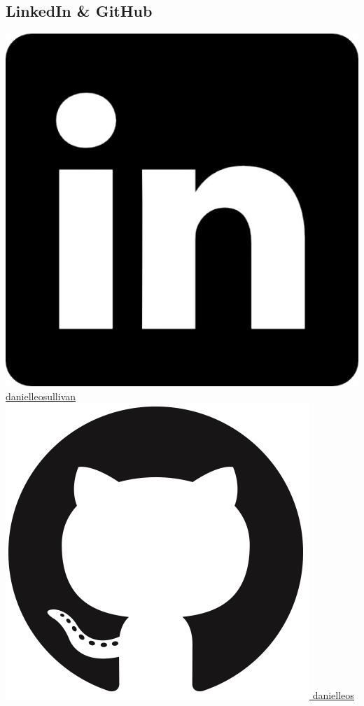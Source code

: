 \documentclass[]{friggeri-cv}
\begin{document}
\begin{aside}
  \section{LinkedIn \& GitHub}
    \href{https://www.linkedin.com/in/danielleosullivan}{\includegraphics[scale=0.015]{img/linkedin.jpg} danielleosullivan}
    \href{https://github.com/danielleos}{\includegraphics[scale=0.025]{img/github.png} danielleos}
    ~

\end{aside}
\end{document}
